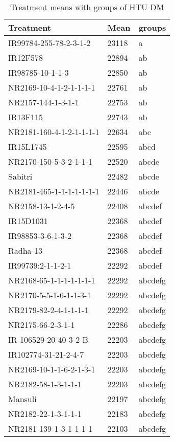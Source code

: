 \documentclass[]{article}
\begin{document}
\begin{longtable}{lll}
\caption{\label{tab:two-fac-groups-tab-agroclimate-normal}Treatment means with groups of HTU DM}\\
\toprule
Treatment & Mean & groups\\
\midrule
\rowcolor{gray!6}  IR99784-255-78-2-3-1-2 & 23118 & a\\
IR12F578 & 22894 & ab\\
\rowcolor{gray!6}  IR98785-10-1-1-3 & 22850 & ab\\
NR2169-10-4-1-2-1-1-1-1 & 22761 & ab\\
\rowcolor{gray!6}  NR2157-144-1-3-1-1 & 22753 & ab\\
\addlinespace
IR13F115 & 22743 & ab\\
\rowcolor{gray!6}  NR2181-160-4-1-2-1-1-1-1 & 22634 & abc\\
IR15L1745 & 22595 & abcd\\
\rowcolor{gray!6}  NR2170-150-5-3-2-1-1-1 & 22520 & abcde\\
Sabitri & 22482 & abcde\\
\addlinespace
\rowcolor{gray!6}  NR2181-465-1-1-1-1-1-1-1 & 22446 & abcde\\
NR2158-13-1-2-4-5 & 22408 & abcdef\\
\rowcolor{gray!6}  IR15D1031 & 22368 & abcdef\\
IR98853-3-6-1-3-2 & 22368 & abcdef\\
\rowcolor{gray!6}  Radha-13 & 22368 & abcdef\\
\addlinespace
IR99739:2-1-1-2-1 & 22292 & abcdef\\
\rowcolor{gray!6}  NR2168-65-1-1-1-1-1-1-1 & 22292 & abcdefg\\
NR2170-5-5-1-6-1-1-3-1 & 22292 & abcdefg\\
\rowcolor{gray!6}  NR2179-82-2-4-1-1-1-1 & 22292 & abcdefg\\
NR2175-66-2-3-1-1 & 22286 & abcdefg\\
\addlinespace
\rowcolor{gray!6}  IR 106529-20-40-3-2-B & 22203 & abcdefg\\
IR102774-31-21-2-4-7 & 22203 & abcdefg\\
\rowcolor{gray!6}  NR2169-10-1-1-6-2-1-3-1 & 22203 & abcdefg\\
NR2182-58-1-3-1-1-1 & 22203 & abcdefg\\
\rowcolor{gray!6}  Mansuli & 22197 & abcdefg\\
\addlinespace
NR2182-22-1-3-1-1-1 & 22183 & abcdefg\\
\rowcolor{gray!6}  NR2181-139-1-3-1-1-1-1 & 22103 & abcdefg\\

\end{longtable}
\end{document}
